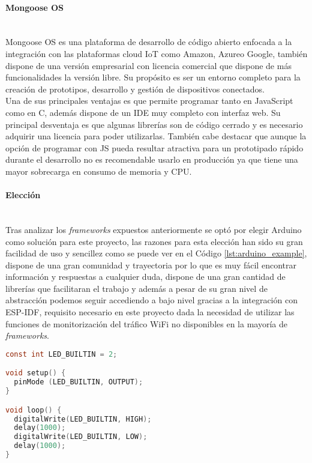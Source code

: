 \documentclass[../proyecto.tex]{subfiles}
\begin{document}
\paragraph{Mongoose OS}\mbox{}\\
Mongoose OS es una plataforma de desarrollo de código abierto enfocada a la integración con las plataformas cloud IoT como Amazon, Azureo Google, también dispone de una versión empresarial con licencia comercial que dispone de más funcionalidades la versión libre. Su propósito es ser un entorno completo para la creación de prototipos, desarrollo y gestión de dispositivos conectados.\\

Una de sus principales ventajas es que permite programar tanto en JavaScript como en C, además dispone de un IDE muy completo con interfaz web. Su principal desventaja es que algunas librerías son de código cerrado y es necesario adquirir una licencia para poder utilizarlas. También cabe destacar que aunque la opción de programar con JS pueda resultar atractiva para un prototipado rápido durante el desarrollo no es recomendable usarlo en producción ya que tiene una mayor sobrecarga en consumo de memoria y CPU.\\

\paragraph{Elección}\mbox{}\\

Tras analizar los \textit{frameworks} expuestos anteriormente se optó por elegir Arduino como solución para este proyecto, las razones para esta elección han sido su gran facilidad de uso y sencillez como se puede ver en el Código \ref{lst:arduino_example}, dispone de una gran comunidad y trayectoria por lo que es muy fácil encontrar información y respuestas a cualquier duda, dispone de una gran cantidad de librerías que facilitaran el trabajo y además a pesar de su gran nivel de abstracción podemos seguir accediendo a bajo nivel gracias a la integración con ESP-IDF, requisito necesario en este proyecto dada la necesidad de utilizar las funciones de monitorización del tráfico WiFi no disponibles en la mayoría de \textit{frameworks}.\\

\begin{minipage}{\linewidth}
\begin{lstlisting}[language=C, caption=Ejemplo de código para hacer parpadear un led con Arduino, captionpos=b, frame=single, label={lst:arduino_example}]
const int LED_BUILTIN = 2;

void setup() {
  pinMode (LED_BUILTIN, OUTPUT);
}

void loop() {
  digitalWrite(LED_BUILTIN, HIGH);
  delay(1000);
  digitalWrite(LED_BUILTIN, LOW);
  delay(1000);
}
\end{lstlisting}
\end{minipage}
\end{document}
